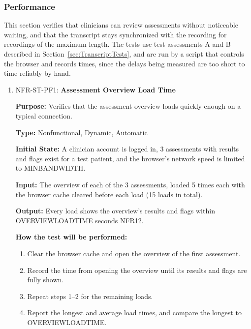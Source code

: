 \documentclass[12pt, titlepage]{article}
\newcommand{\srsnfr}[1]{\href{https://github.com/Nour-Fawaz/MacaBoca/blob/main/pdfs/SRS/SRS.pdf}{NFR}}
\renewcommand{\_}{\oldunderscore\allowbreak}
\begin{document}
\subsubsection{Performance}
This section verifies that clinicians can review assessments without noticeable waiting, and that the transcript stays synchronized with the recording for recordings of the maximum length.
The tests use test assessments A and B described in Section~\ref{sec:TranscriptTests}, and are run by a script that controls the browser and records times, since the delays being measured are too short to time reliably by hand.
\begin{enumerate}
  \item NFR-ST-PF1: \textbf{Assessment Overview Load Time\\}
  \begin{mdframed}[linewidth=0.5mm]
      \textbf{Purpose:} Verifies that the assessment overview loads quickly enough on a typical connection. \par
      \textbf{Type:} Nonfunctional, Dynamic, Automatic \par
      \textbf{Initial State:} A clinician account is logged in, 3 assessments with results and flags exist for a test patient, and the browser's network speed is limited to MIN\_BANDWIDTH. \par
      \textbf{Input:} The overview of each of the 3 assessments, loaded 5 times each with the browser cache cleared before each load (15 loads in total). \par
      \textbf{Output:} Every load shows the overview's results and flags within OVERVIEW\_LOAD\_TIME seconds \srsnfr*{12}. \par
      \textbf{How the test will be performed:}
      \begin{enumerate}
        \item[1.] Clear the browser cache and open the overview of the first assessment.
        \item[2.] Record the time from opening the overview until its results and flags are fully shown.
        \item[3.] Repeat steps 1--2 for the remaining loads.
        \item[4.] Report the longest and average load times, and compare the longest to OVERVIEW\_LOAD\_TIME.
      \end{enumerate}
  \end{mdframed}


\end{enumerate}
\end{document}
